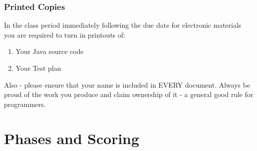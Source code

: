 \documentclass[11pt]{exam}
\begin{document}
\subsubsection*{Printed Copies}
In the class period immediately following the due date for electronic materials you are required to turn in printouts of:
\begin{enumerate}
	\item Your Java source code
	\item Your Test plan
\end{enumerate}
Also - please ensure that your name is included in EVERY document.  Always be proud of the work you produce and claim ownership of it - a general good rule for programmers.

\section*{Phases and Scoring}
\end{document}
